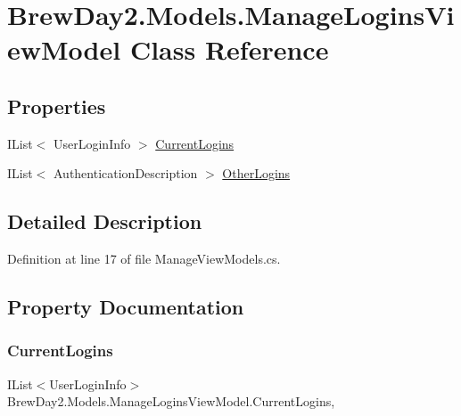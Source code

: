 \hypertarget{class_brew_day2_1_1_models_1_1_manage_logins_view_model}{}\section{Brew\+Day2.\+Models.\+Manage\+Logins\+View\+Model Class Reference}
\label{class_brew_day2_1_1_models_1_1_manage_logins_view_model}
\subsection*{Properties}
\begin{DoxyCompactItemize}
\item 
I\+List$<$ User\+Login\+Info $>$ \mbox{\hyperlink{class_brew_day2_1_1_models_1_1_manage_logins_view_model_a3e3fecc3f6b55474f072de0df7d964c5}{Current\+Logins}}
\item 
I\+List$<$ Authentication\+Description $>$ \mbox{\hyperlink{class_brew_day2_1_1_models_1_1_manage_logins_view_model_aadb8cb91c86a81388a5f4268769a8099}{Other\+Logins}}
\end{DoxyCompactItemize}


\subsection{Detailed Description}


Definition at line 17 of file Manage\+View\+Models.\+cs.



\subsection{Property Documentation}
\mbox{\label{class_brew_day2_1_1_models_1_1_manage_logins_view_model_a3e3fecc3f6b55474f072de0df7d964c5}} 
\subsubsection{\texorpdfstring{Current\+Logins}{CurrentLogins}}
{\footnotesize\ttfamily I\+List$<$User\+Login\+Info$>$ Brew\+Day2.\+Models.\+Manage\+Logins\+View\+Model.\+Current\+Logins\hspace{0.3cm}{\ttfamily [get]}, {\ttfamily [set]}}



